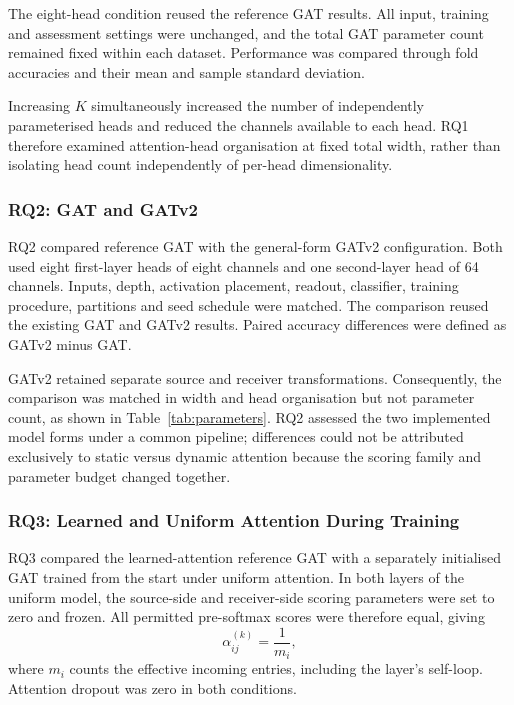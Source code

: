 \documentclass[11pt,a4paper]{article}
\begin{document}
The eight-head condition reused the reference GAT results. All input, training and assessment settings were unchanged, and the total GAT parameter count remained fixed within each dataset. Performance was compared through fold accuracies and their mean and sample standard deviation.

Increasing \(K\) simultaneously increased the number of independently parameterised heads and reduced the channels available to each head. RQ1 therefore examined attention-head organisation at fixed total width, rather than isolating head count independently of per-head dimensionality.

\subsubsection{RQ2: GAT and GATv2}
\label{sec:rq2}

RQ2 compared reference GAT with the general-form GATv2 configuration. Both used eight first-layer heads of eight channels and one second-layer head of 64 channels. Inputs, depth, activation placement, readout, classifier, training procedure, partitions and seed schedule were matched. The comparison reused the existing GAT and GATv2 results. Paired accuracy differences were defined as GATv2 minus GAT.

GATv2 retained separate source and receiver transformations. Consequently, the comparison was matched in width and head organisation but not parameter count, as shown in Table~\ref{tab:parameters}. RQ2 assessed the two implemented model forms under a common pipeline; differences could not be attributed exclusively to static versus dynamic attention because the scoring family and parameter budget changed together.

\subsubsection{RQ3: Learned and Uniform Attention During Training}
\label{sec:rq3}

RQ3 compared the learned-attention reference GAT with a separately initialised GAT trained from the start under uniform attention. In both layers of the uniform model, the source-side and receiver-side scoring parameters were set to zero and frozen. All permitted pre-softmax scores were therefore equal, giving
\[
\alpha_{ij}^{(k)}=\frac{1}{m_i},
\]
where \(m_i\) counts the effective incoming entries, including the layer's self-loop. Attention dropout was zero in both conditions.
\end{document}
